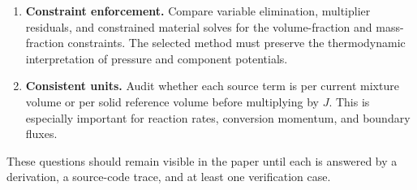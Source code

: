 \begin{enumerate}[leftmargin=*]
	\item \textbf{Constraint enforcement.}  Compare variable elimination,
	multiplier residuals, and constrained material solves for the volume-fraction
	and mass-fraction constraints.  The selected method must preserve the
	thermodynamic interpretation of pressure and component potentials.

	\item \textbf{Consistent units.}  Audit whether each source term is per
	current mixture volume or per solid reference volume before multiplying by
	\(J\).  This is especially important for reaction rates, conversion
	momentum, and boundary fluxes.
\end{enumerate}

These questions should remain visible in the paper until each is answered by a
derivation, a source-code trace, and at least one verification case.
